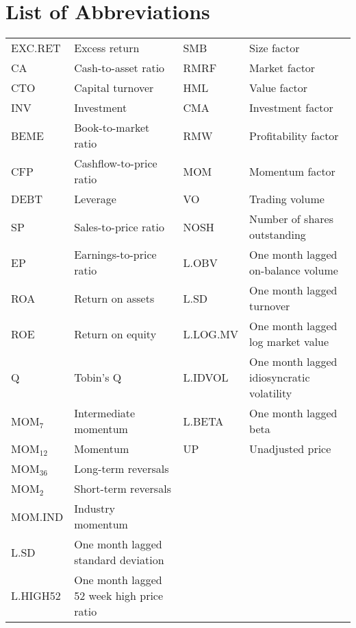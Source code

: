 \documentclass[12pt]{article}
\begin{document}
\section*{List of Abbreviations}
\begin{table}[H] 
\setlength\extrarowheight{10pt}
\begin{tabularx}{\textwidth}{@{\extracolsep{4pt}} l Y l Y} 
EXC.RET & Excess return & SMB & Size factor\\ 
CA & Cash-to-asset ratio & RMRF & Market factor\\
CTO & Capital turnover & HML & Value factor\\
INV & Investment & CMA & Investment factor\\
BEME & Book-to-market ratio & RMW & Profitability factor\\
CFP & Cashflow-to-price ratio & MOM & Momentum factor\\
DEBT & Leverage & VO & Trading volume\\
SP & Sales-to-price ratio & NOSH & Number of shares outstanding\\
EP & Earnings-to-price ratio & L.OBV & One month lagged on-balance volume \\
ROA & Return on assets & L.SD & One month lagged turnover \\
ROE & Return on equity & L.LOG.MV & One month lagged log market value\\
Q & Tobin's Q & L.IDVOL & One month lagged idiosyncratic volatility \\
MOM$_7$ & Intermediate momentum & L.BETA & One month lagged beta\\
MOM$_{12}$ & Momentum & UP & Unadjusted price\\
MOM$_{36}$ & Long-term reversals & &\\
MOM$_{2}$ & Short-term reversals & &\\
MOM.IND & Industry momentum & &\\
L.SD & One month lagged standard deviation & &\\
L.HIGH52 & One month lagged 52 week high price ratio & &\\
\end{tabularx}
\end{table} 

\newpage

\end{document}
